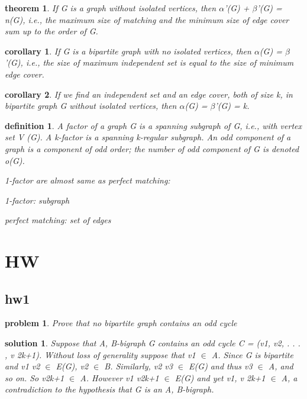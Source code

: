 \documentclass[twocolumn]{article}
\newtheorem{theorem}{theorem}[section]  %
\newtheorem{definition}{definition}
\newtheorem{corollary}{corollary}
\newtheorem{problem}{problem}
\newtheorem{solution}{solution}
\begin{document}
\begin{CJK*}{UTF8}{bkai}
    \begin{theorem}
        If G is a graph without isolated vertices, then $\alpha$'(G) + $\beta$'(G) = n(G), i.e., the
 maximum size of matching and the minimum size of edge cover sum up to the
 order of G.
    \end{theorem}

    \begin{corollary}
        If G is a bipartite graph with no isolated vertices, then $\alpha$(G) = $\beta$'(G), i.e., the
 size of maximum independent set is equal to the size of minimum edge cover.
    \end{corollary}

    \begin{corollary}
        If we find an independent set and an edge cover, both of size k, in bipartite
 graph G without isolated vertices, then $\alpha$(G) = $\beta$'(G) = k.
    \end{corollary}

    \begin{definition}
        A factor of a graph G is a spanning subgraph of G, i.e., with vertex set V (G).
 A k-factor is a spanning k-regular subgraph. An odd component of a graph is
 a component of odd order; the number of odd component of G is denoted o(G).

 1-factor are almost same as perfect matching:

 1-factor: subgraph
 
 perfect matching: set of edges
    \end{definition}

\section{HW}
\subsection{hw1}
    \begin{problem}
 Prove that no bipartite graph contains an odd cycle    
    \end{problem}
    
    \begin{solution}
    Suppose that A, B-bigraph G contains an odd cycle C = (v1, v2, . . . , v 2k+1). Without loss of generality suppose that v1 $\in$ A. Since G is bipartite and v1 v2 $\in$ E(G), v2 $\in$ B. Similarly, v2 v3 $\in$ E(G)
and thus v3 $\in$ A, and so on. So v2k+1 $\in$ A. However v1 v2k+1 $\in$ E(G) and yet v1, v 2k+1 $\in$ A, a
contradiction to the hypothesis that G is an A, B-bigraph.


\end{solution}
\end{CJK*}
\end{document}
